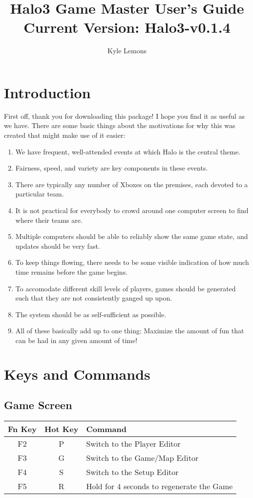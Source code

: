 \documentclass[10pt,a4paper]{report}
\author{Kyle Lemons}
\title{Halo3 Game Master User's Guide \\
{\large{Current Version: Halo3-v0.1.4}}}
\begin{document}
\maketitle
\tableofcontents
\pagebreak

\chapter{Introduction}
First off, thank you for downloading this package!  I hope you find it as useful as we have.
There are some basic things about the motivations for why this was created that might make use of it easier:
\begin{enumerate}
\item We have frequent, well-attended events at which Halo is the central theme.
\item Fairness, speed, and variety are key components in these events.
\item There are typically any number of Xboxes on the premises, each devoted to a particular team.
\item It is not practical for everybody to crowd around one computer screen to find where their teams are.
\item Multiple computers should be able to reliably show the same game state, and updates should be very fast.
\item To keep things flowing, there needs to be some visible indication of how much time remains before the game begins.
\item To accomodate different skill levels of players, games should be generated such that they are not consistently ganged up upon.
\item The system should be as self-sufficient as possible.
\item All of these basically add up to one thing: Maximize the amount of fun that can be had in any given amount of time!
\end{enumerate}

\chapter{Keys and Commands}
\section{Game Screen}
\begin{tabular}{c|c|l}
Fn Key & Hot Key & Command \\
\hline
F2 & P & Switch to the Player Editor \\
F3 & G & Switch to the Game/Map Editor \\
F4 & S & Switch to the Setup Editor \\
F5 & R & Hold for 4 seconds to regenerate the Game \\
\end{tabular}
\end{document}
